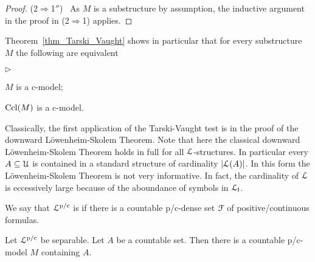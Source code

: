 \documentclass{amsproc}
\newcommand{\mylabel}[1]{{#1}\hfill}
\renewenvironment{itemize}
  {\begin{list}{$\triangleright$}{%
  \setlength{\parskip}{0mm}
  \setlength{\topsep}{.4\baselineskip}
  \setlength{\rightmargin}{0mm}
  \setlength{\listparindent}{0mm}
  \setlength{\itemindent}{0mm}
  \setlength{\labelwidth}{3ex}
  \setlength{\itemsep}{.2\baselineskip}
  \setlength{\parsep}{.2\baselineskip}
  \setlength{\partopsep}{0mm}
  \setlength{\labelsep}{1ex}
  \setlength{\leftmargin}{\labelwidth+\labelsep}
  \let\makelabel\mylabel}}{%
\end{list}}
\renewcommand*{\emph}[1]{%
   \smash{\tikz[baseline]\node[rectangle, fill=teal!25, rounded corners, inner xsep=0.5ex, inner ysep=0.2ex, anchor=base, minimum height = 2.7ex]{\strut #1};}}
\begin{document}
{\begin{proof}
  (2$\Rightarrow$1$''$) \ 
  As $M$ is a substructure by assumption, the inductive argument in the proof in (2$\Rightarrow$1) applies.
\end{proof}


    
   


\begin{remark}\label{rem_Tarski_Vaught}
  Theorem~\ref{thm_Tarski_Vaught} shows in particular that for every substructure $M$ the following are equivalent
  \begin{itemize}
    \item[1.] $M$ is a c-model;
    \item[2.] ${\rm Ccl}(M)$ is a c-model.
  \end{itemize}
\end{remark}

Classically, the first application of the Tarski-Vaught test is in the proof of the downward L\"owen\-heim-Skolem Theorem.
Note that here the classical downward L\"owenheim-Skolem Theorem holds in full for all ${\EuScript L}$-structures.
In particular every $A\subseteq{\EuScript U}$ is contained in a standard structure of cardinality $|{\EuScript L}(A)|$.
In this form the L\"owenheim-Skolem Theorem is not very informative.
In fact, the cardinality of ${\EuScript L}$ is eccessively large because of the aboundance of symbols in ${\EuScript L}_{\sf I}$.

We say that ${\EuScript L}^{\rm p/c}$ is \emph{separable\/} if there is a countable p/c-dense set ${\EuScript F}$ of positive/continuous formulas.

\begin{proposition}
  Let ${\EuScript L}^{\rm p/c}$ be separable.
  Let $A$ be a countable set.
  Then there is a countable p/c-model $M$ containing $A$.
\end{proposition}

}
\end{document}
